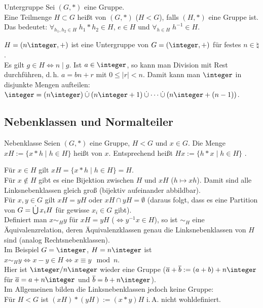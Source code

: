 \linie

\begin{Def}{Untergruppe}
    Sei $(G, \ast)$ eine Gruppe.\\
    Eine Teilmenge $H \subset G$ heißt  von $(G, \ast)$
    ($H < G$), falls $(H, \ast)$ eine Gruppe ist.\\
    Das bedeutet:
    $\forall_{h_1, h_2 \in H}\; h_1 \ast h_2 \in H$, $e \in H$ und
    $\forall_{h \in H}\; h^{-1} \in H$.
\end{Def}

\begin{Bsp}
    $H = (n\integer, +)$ ist eine Untergruppe von $G = (\integer, +)$ für
    festes $n \in \natural$.\\
    Es gilt $g \in H \iff n \;|\; g$.
    Ist $a \in \integer$, so kann man Division mit Rest durchführen, d.\,h.
    $a = bn + r$ mit $0 \le |r| < n$.
    Damit kann man $\integer$ in disjunkte Mengen aufteilen:\\
    $\integer = (n\integer) \dcup (n\integer + 1) \dcup \dotsb \dcup
    (n\integer + (n - 1))$.
\end{Bsp}

\subsection{%
    Nebenklassen und Normalteiler%
}

\begin{Def}{Nebenklasse}
    Seien $(G, \ast)$ eine Gruppe, $H < G$ und $x \in G$.
    Die Menge $xH := \{x \ast h \;|\; h \in H\}$ heißt
     von $x$.
    Entsprechend heißt $Hx := \{h \ast x \;|\; h \in H\}$
    .
\end{Def}

\begin{Bem}
    Für $x \in H$ gilt $xH = \{x \ast h \;|\; h \in H\} = H$.\\
    Für $x \notin H$ gibt es eine Bijektion zwischen $H$ und $xH$
    ($h \mapsto xh$).
    Damit sind alle Linksnebenklassen gleich groß
    (bijektiv aufeinander abbildbar).\\
    Für $x, y \in G$ gilt $xH = yH$ oder $xH \cap yH = \emptyset$
    (daraus folgt, dass es eine Partition von $G = \mathop{\dot{\bigcup}} x_i H$
    für gewisse $x_i \in G$ gibt).\\
    Definiert man $x \sim_H y$ für $xH = yH$ ($\!\!\iff y^{-1} x \in H$),
    so ist $\sim_H$ eine Äquivalenzrelation,
    deren Äquivalenzklassen genau die Linksnebenklassen von $H$ sind
    (analog Rechtsnebenklassen).\\
    Im Beispiel $G = \integer$, $H = n\integer$ ist
    $x \sim_H y \iff x - y \in H \iff x \equiv y \mod n$.\\
    Hier ist $\integer/n\integer$ wieder eine Gruppe
    ($\overline{a} + \overline{b} := (a + b) + n\integer$ für
    $\overline{a} = a + n\integer$ und $\overline{b} = b + n\integer$).\\
    Im Allgemeinen bilden die Linksnebenklassen jedoch keine Gruppe:\\
    Für $H < G$ ist $(xH) \ast (yH) := (x \ast y)H$ i.\,A. nicht wohldefiniert.
\end{Bem}

